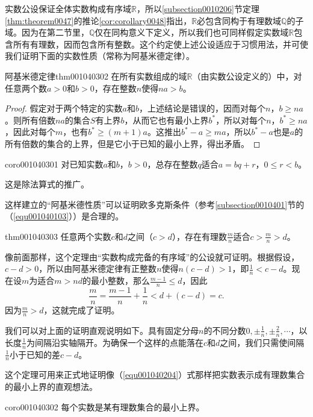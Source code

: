 实数公设保证全体实数构成有序域$\mathbb{R}$，所以\ref{subsection0010206}节定理\ref{thm:theorem0047}的推论\ref{cor:corollary0048}指出，$\mathbb{R}$必包含同构于有理数域$\mathbb{Q}$的子域。因为在第二节里，$\mathbb{Q}$仅在同构意义下定义，所以我们也可同样假定实数域$\mathbb{R}$包含所有有理数，因而包含所有整数。这个约定使上述公设适应于习惯用法，并可使我们证明下面的实数性质（常称为阿基米德定律）。
\begin{theorem}{阿基米德定律}{thm001040302}
在所有实数组成的域$\mathbb{R}$（由实数公设定义的）中，对任意两个数$a > 0$和$b>0$，存在整数$n$使得$na > b$。
\end{theorem}
\begin{proof}
假定对于两个特定的实数$a$和$b$，上述结论是错误的，因而对每个$n$，$b \ge na$。则所有倍数$na$的集合$S$有上界$b$，从而它也有最小上界$b^*$，所以对每个$n$，$b^* \ge na$，因此对每个$m$，也有$b^* \ge (m+1)a$。这推出$b^*-a \ge ma$，所以$b^*-a$也是$a$的所有倍数的集合的上界，但是它小于已知的最小上界，得出矛盾。
\end{proof}

\begin{corollary}{}{coro001040301}
对已知实数$a$和$b$，$b > 0$，总存在整数$q$适合$a = bq + r$，$0 \le r < b$。
\end{corollary}

这是除法算式的推广。

这样建立的“阿基米德性质”可以证明欧多克斯条件（参考\ref{subsection0010401}节的（\ref{equ001040103}））是合理的。

\begin{theorem}{}{thm001040303}
任意两个实数$c$和$d$之间（$c > d$），存在有理数$\frac{m}{n}$适合$c > \frac{m}{n} > d$。
\end{theorem}

像前面那样，这个定理由“实数构成完备的有序域”的公设就可证明。根据假设，$c-d > 0$，所以由阿基米德定律有正整数$n$使得$n(c-d)>1$，即$\frac{1}{n} < c-d$。现在设$m$为适合$m>nd$的最小整数，那么$\frac{m-1}{n} \le d$，因此
\[
\frac{m}{n} = \frac{m-1}{n} + \frac{1}{n} < d + (c-d)=c.
\]
因为$\frac{m}{n} > d$，这就完成了证明。

我们可以对上面的证明直观说明如下。具有固定分母$n$的不同分数$0, \pm{\frac{1}{n}},\pm{\frac{2}{n}},\cdots$，以长度$\frac{1}{n}$为间隔沿实轴隔开。为确保一个这样的点能落在$c$和$d$之间，我们只需使间隔$\frac{1}{n}$小于已知的差$c-d$。

这个定理可用来正式地证明像（\ref{equ001040204}）式那样把实数表示成有理数集合的最小上界的直观想法。

\begin{corollary}{}{coro001040302}
每个实数是某有理数集合的最小上界。
\end{corollary}

